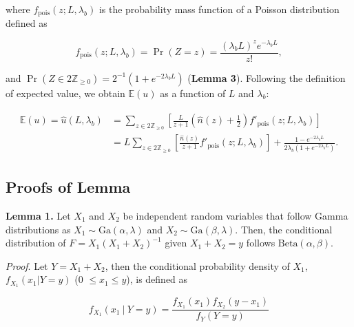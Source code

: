 \documentclass[11pt, class=article, crop=false]{standalone}
\begin{document}
where $f_{\text{pois}}(z; L, \lambda_b)$ is the probability mass function of a Poisson distribution defined as

\begin{equation}
    f_{\text{pois}}(z; L, \lambda_b) = \Pr(Z = z) = \frac{(\lambda_b L)^{z} e^{-\lambda_b L}}{z!},
\end{equation}

and $\Pr(Z \in 2\mathbb{Z}_{\ge 0}) = 2^{-1}(1 + e^{- 2 \lambda_b L})$ (\textbf{Lemma 3}). 
Following the definition of expected value, we obtain $\mathbb{E}(u)$ as a function of $L$ and $\lambda_b$:

\begin{align}
    \begin{split}
        \mathbb{E}(u) = \hat{u}(L, \lambda_b) 
                    &= \sum_{z \in 2\mathbb{Z}_{\ge 0}} \left[ \frac{L}{z + 1} \left(\hat{n}(z) + \frac{1}{2}\right) f'_{\text{pois}}(z; L, \lambda_b) \right]\\
                    &= L \sum_{z \in 2\mathbb{Z}_{\ge 0}} \left[ \frac{\hat{n}(z)}{z + 1} f'_{\text{pois}}(z; L, \lambda_b)\right] + 
                    \frac{1 - e^{-2 \lambda_b L}}{2 \lambda_b (1 + e^{-2 \lambda_b L})}.
    \end{split}
\end{align}

\newpage

\subsection{Proofs of Lemma}

\textbf{Lemma 1.}
Let $X_1$ and $X_2$ be independent random variables that follow Gamma distributions as $X_1 \sim \mbox{Ga}(\alpha, \lambda)$ and $X_2 \sim \mbox{Ga}(\beta, \lambda)$.
Then, the conditional distribution of $F = X_1(X_1 + X_2)^{-1}$ given $X_1 + X_2 = y$ follows $\mbox{Beta}(\alpha, \beta)$.

\textit{Proof}.
Let $Y = X_1 + X_2$, then the conditional probability density of $X_1$, $f_{X_1}(x_1 | Y = y)$ (0 $\le x_1 \le y$), is defined as

\begin{equation}
    f_{X_1}(x_1~|~Y = y) = \frac{f_{X_1}(x_1) f_{X_2}(y - x_1)}{f_{Y}(Y = y)}
\end{equation}
\end{document}
